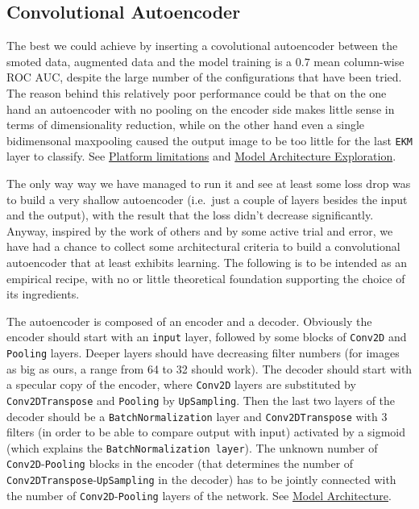 \documentclass{acm_proc_article-sp}
\begin{document}
\hypertarget{ae}{%
\subsection{Convolutional Autoencoder}\label{ae}}

The best we could achieve by inserting a covolutional autoencoder
between the smoted data, augmented data and the model training is a
\(0.7\) mean column-wise ROC AUC, despite the large number of the
configurations that have been tried. The reason behind this relatively
poor performance could be that on the one hand an autoencoder with no
pooling on the encoder side makes little sense in terms of
dimensionality reduction, while on the other hand even a single
bidimensonal maxpooling caused the output image to be too little for the
last \texttt{EKM} layer to classify. See
\protect\hyperlink{limitations}{Platform limitations} and
\protect\hyperlink{model-architecture}{Model Architecture Exploration}.

The only way way we have managed to run it and see at least some loss
drop was to build a very shallow autoencoder (i.e.~just a couple of
layers besides the input and the output), with the result that the loss
didn't decrease significantly. Anyway, inspired by the work of others
and by some active trial and error, we have had a chance to collect some
architectural criteria to build a convolutional autoencoder that at
least exhibits learning. The following is to be intended as an empirical
recipe, with no or little theoretical foundation supporting the choice
of its ingredients.

The autoencoder is composed of an encoder and a decoder. Obviously the
encoder should start with an \texttt{input} layer, followed by some
blocks of \texttt{Conv2D} and \texttt{Pooling} layers. Deeper layers
should have decreasing filter numbers (for images as big as ours, a
range from 64 to 32 should work). The decoder should start with a
specular copy of the encoder, where \texttt{Conv2D} layers are
substituted by \texttt{Conv2DTranspose} and \texttt{Pooling} by
\texttt{UpSampling}. Then the last two layers of the decoder should be a
\texttt{BatchNormalization} layer and \texttt{Conv2DTranspose} with 3
filters (in order to be able to compare output with input) activated by
a sigmoid (which explains the \texttt{BatchNormalization\ layer}). The
unknown number of \texttt{Conv2D}-\texttt{Pooling} blocks in the encoder
(that determines the number of
\texttt{Conv2DTranspose}-\texttt{UpSampling} in the decoder) has to be
jointly connected with the number of \texttt{Conv2D}-\texttt{Pooling}
layers of the network. See \protect\hyperlink{model-architecture}{Model
Architecture}.
\end{document}
